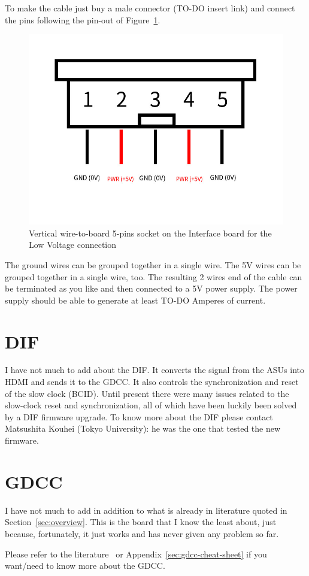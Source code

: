 To make the cable just buy a male connector (TO-DO insert link) and
connect the pins following the pin-out of
Figure~\ref{low-vol-pin-out}.
\begin{figure}[H]
  \centering \includegraphics[width=0.5\linewidth]{low-vol-pin-out}
  \caption{Vertical wire-to-board 5-pins socket on the Interface board
    for the Low Voltage connection}\label{low-vol-pin-out}
\end{figure}
The ground wires can be grouped together in a single wire. The 5V
wires can be grouped together in a single wire, too. The resulting 2
wires end of the cable can be terminated as you like and then
connected to a 5V power supply. The power supply should be able to
generate at least TO-DO Amperes of current.
  
\section{DIF}
I have not much to add about the DIF. It converts the signal from the
ASUs into HDMI and sends it to the GDCC. It also controls the
synchronization and reset of the slow clock (BCID). Until present
there were many issues related to the slow-clock reset and
synchronization, all of which have been luckily been solved by a DIF
firmware upgrade. To know more about the DIF please contact Matsushita
Kouhei (Tokyo University): he was the one that tested the new
firmware.

\section{GDCC}
I have not much to add in addition to what is already in literature
quoted in Section~\ref{sec:overview}. This is the board that I know
the least about, just because, fortunately, it just works and has
never given any problem so far.

Please refer to the literature~\cite{GDCC:2012} or
Appendix~\ref{sec:gdcc-cheat-sheet} if you want/need to know more
about the GDCC.


